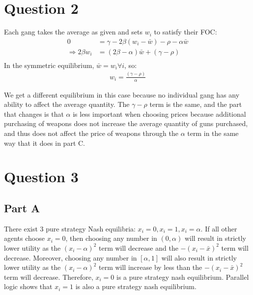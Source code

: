\documentclass[11pt]{article} %
\begin{document}
\section{Question 2}
Each gang takes the average as given and sets $w_i$ to satisfy their FOC:
\begin{align*}
0&=\gamma - 2\beta (w_i - \bar{w}) - \rho - \alpha \bar{w}\\
\Rightarrow 2\beta w_i &= ( 2\beta - \alpha)\bar{w} + (\gamma - \rho)\\
\end{align*}
In the symmetric equilibrium, $\bar{w} = w_i \forall i$, so:
\begin{align*}
 w_i = \frac{(\gamma - \rho)}{\alpha}
\end{align*}

We get a different equilibrium in this case because no individual gang has any ability to affect the average quantity. The $\gamma - \rho$ term is the same, and the part that changes is that $\alpha$ is less important when choosing prices because additional purchasing of weapons does not increase the average quantity of guns purchased, and thus does not affect the price of weapons through the $\alpha$ term in the same way that it does in part C.

\section{Question 3} 
\subsection{Part A}
%
There exist 3 pure strategy Nash equilibria: $x_i=0,x_i=1,x_i = \alpha.$ If all other agents choose $x_i=0$, then choosing any number in $(0,\alpha)$ will result in strictly lower utility as the $(x_i - \alpha)^2$ term will decrease and the $-(x_i - \bar{x})^2$ term will decrease. Moreover, choosing any number in $[\alpha,1]$ will also result in strictly lower utility as the $(x_i - \alpha)^2$ term will increase by less than the $-(x_i - \bar{x})^2$ term will decrease. Therefore, $x_i = 0$ is a pure strategy nash equilibrium. Parallel logic shows that $x_i=1$ is also a pure strategy nash equilibrium.
\end{document}

